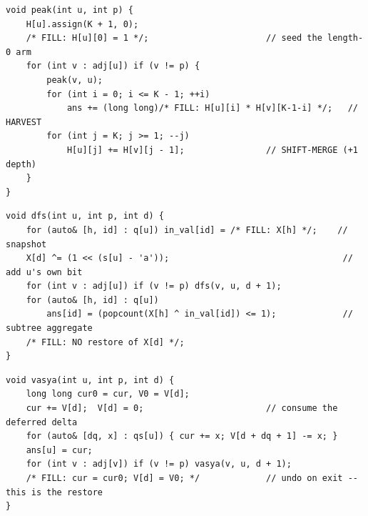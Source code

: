\begin{lstlisting}[caption={Drill 3 -- harvest at the peak (from \coderef{c10-peak})}]
void peak(int u, int p) {
    H[u].assign(K + 1, 0);
    /* FILL: H[u][0] = 1 */;                       // seed the length-0 arm
    for (int v : adj[u]) if (v != p) {
        peak(v, u);
        for (int i = 0; i <= K - 1; ++i)
            ans += (long long)/* FILL: H[u][i] * H[v][K-1-i] */;   // HARVEST
        for (int j = K; j >= 1; --j)
            H[u][j] += H[v][j - 1];                // SHIFT-MERGE (+1 depth)
    }
}
\end{lstlisting}

\begin{lstlisting}[caption={Drill 4 -- Shape B: per-depth XOR accumulator (from \coderef{c10-depth-hist})}]
void dfs(int u, int p, int d) {
    for (auto& [h, id] : q[u]) in_val[id] = /* FILL: X[h] */;    // snapshot
    X[d] ^= (1 << (s[u] - 'a'));                                  // add u's own bit
    for (int v : adj[u]) if (v != p) dfs(v, u, d + 1);
    for (auto& [h, id] : q[u])
        ans[id] = (popcount(X[h] ^ in_val[id]) <= 1);             // subtree aggregate
    /* FILL: NO restore of X[d] */;
}
\end{lstlisting}

\begin{lstlisting}[caption={Drill 5 -- Summit: per-depth lazy difference (from \coderef{c10-summit})}]
void vasya(int u, int p, int d) {
    long long cur0 = cur, V0 = V[d];
    cur += V[d];  V[d] = 0;                        // consume the deferred delta
    for (auto& [dq, x] : qs[u]) { cur += x; V[d + dq + 1] -= x; }
    ans[u] = cur;
    for (int v : adj[v]) if (v != p) vasya(v, u, d + 1);
    /* FILL: cur = cur0; V[d] = V0; */             // undo on exit -- this is the restore
}
\end{lstlisting}

